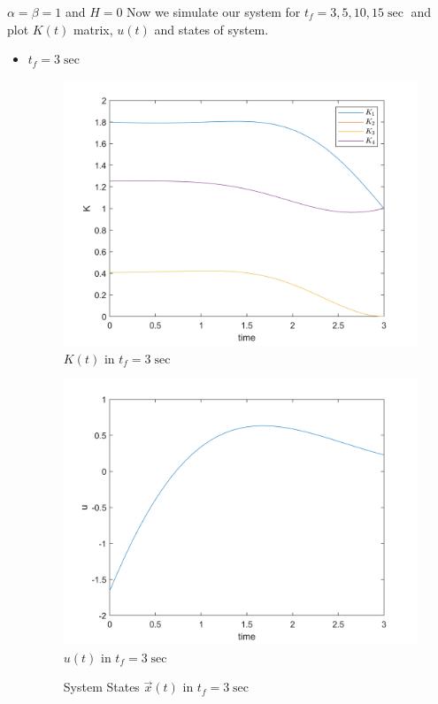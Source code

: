 $\alpha = \beta = 1$ and $H = 0$
Now we simulate our system for $t_f = 3, 5, 10, 15\sec$ and plot $K(t)$ matrix, $u(t)$ and states of system.
\begin{itemize}
	\item $t_f = 3\sec$
	\begin{figure}[H]
		\caption{$K(t)$ in $t_f = 3\sec$}
		\centering
		\includegraphics[width=12cm]{../Code/Q3/figures/K3.png}
	\end{figure}
\begin{figure}[H]
	\caption{$u(t)$ in $t_f = 3\sec$}
	\centering
	\includegraphics[width=12cm]{../Code/Q3/figures/u3.png}
\end{figure}
\begin{figure}[H]
	\caption{System States $\vec x(t)$ in $t_f = 3\sec$}
	\centering

\end{figure}
\end{itemize}
